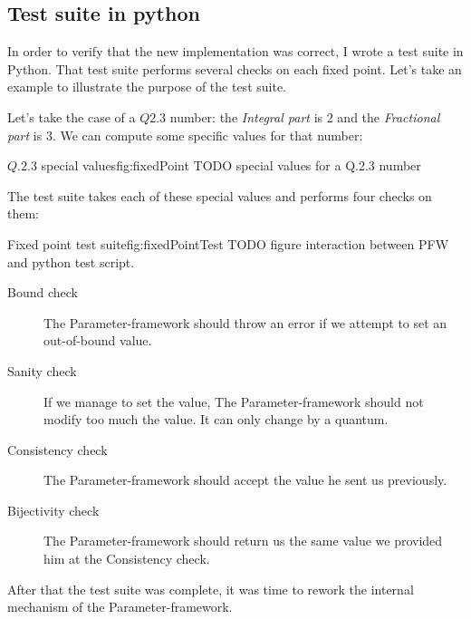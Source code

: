 \subsection{Test suite in python}

In order to verify that the new implementation was correct, I wrote a test suite
in Python. That test suite performs several checks on each fixed point. Let's
take an example to illustrate the purpose of the test suite.

Let's take the case of a $Q2.3$ number: the \emph{Integral part} is $2$ and the
\emph{Fractional part} is $3$. We can compute some specific values for that number:

\begin{figureGraphics}{$Q.2.3$ special values}{fig:fixedPoint}
    TODO special values for a Q.2.3 number
\end{figureGraphics}

The test suite takes each of these special values and performs four checks on
them:

\begin{figureGraphics}{Fixed point test suite}{fig:fixedPointTest}
    TODO figure interaction between PFW and python test script.
\end{figureGraphics}

\begin{description}
    \item[Bound check] The Parameter-framework should throw an error if we
        attempt to set an out-of-bound value.
    \item[Sanity check] If we manage to set the value, The Parameter-framework should not modify too much
        the value. It can only change by a quantum.
    \item[Consistency check] The Parameter-framework should accept the value he sent us previously.
    \item[Bijectivity check] The Parameter-framework should return us the same value we provided him at the Consistency check.
\end{description}

After that the test suite was complete, it was time to rework the internal
mechanism of the Parameter-framework.

